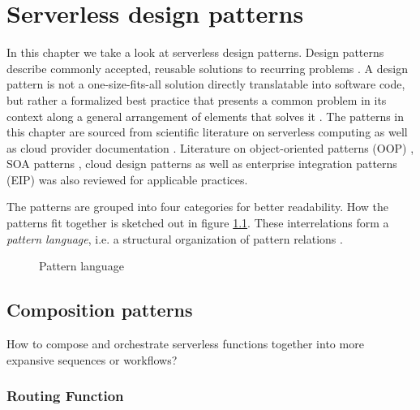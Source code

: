 \chapter{Serverless design patterns} \label{cha:patterns}

In this chapter we take a look at serverless design patterns. Design patterns describe commonly accepted, reusable solutions to recurring problems \parencite{hohpe2004enterprise}. A design pattern is not a one-size-fits-all solution directly translatable into software code, but rather a formalized best practice that presents a common problem in its context along a general arrangement of elements that solves it \parencite{gamma94designPatterns}. The patterns in this chapter are sourced from scientific literature on serverless computing as well as cloud provider documentation \parencite[][]{aws18serverlessLens, microsoft18cloudPatterns}. Literature on object-oriented patterns (OOP) \parencite{gamma94designPatterns}, SOA patterns \parencite{rotem12soa}, cloud design patterns \parencite{microsoft18cloudPatterns} as well as enterprise integration patterns (EIP) \parencite{hohpe2004enterprise} was also reviewed for applicable practices.

The patterns are grouped into four categories for better readability. How the patterns fit together is sketched out in figure \ref{fig:patternLanguage}. These interrelations form a \textit{pattern language}, i.e. a structural organization of pattern relations \parencite{rotem12soa}.

\begin{figure}[h]
  \begin{center}
  \end{center}
  \caption{Pattern language}
  \label{fig:patternLanguage}
\end{figure}

\section{Composition patterns} \label{sec:compositionPatterns}

How to compose and orchestrate serverless functions together into more expansive sequences or workflows?

\subsection{Routing Function} \label{subsec:routingFunction}

